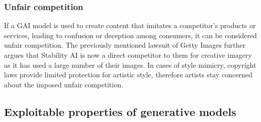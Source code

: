 \documentclass[conference,table]{IEEEtran} %
\begin{document}
\subsubsection{Unfair competition} 
If a GAI model is used to create content that imitates a competitor's products or services, leading to confusion or deception among consumers, it can be considered unfair competition. The previously mentioned lawsuit of Getty Images further argues that Stability AI is now a direct competitor to them for creative imagery as it has used a large number of their images. In cases of style mimicry, copyright laws provide limited protection for artistic style, therefore artists stay concerned about the imposed unfair competition.  



 


 


\subsection{Exploitable properties of generative models}
\end{document}
